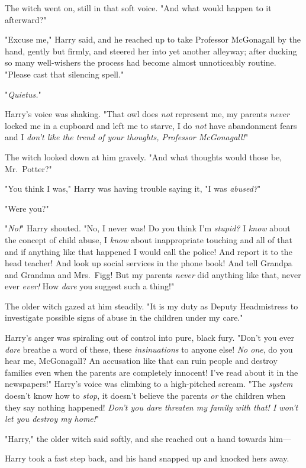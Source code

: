 The witch went on, still in that soft voice. "And what would happen to it
afterward?"

"Excuse me," Harry said, and he reached up to take Professor McGonagall by the
hand, gently but firmly, and steered her into yet another alleyway; after
ducking so many well-wishers the process had become almost unnoticeably
routine. "Please cast that silencing spell."

"\emph{Quietus.}"

Harry's voice was shaking. "That owl does \emph{not} represent me, my parents
\emph{never} locked me in a cupboard and left me to starve, I do \emph{not}
have abandonment fears and I \emph{don't like the trend of your thoughts,
Professor McGonagall!}"

The witch looked down at him gravely. "And what thoughts would those be,
Mr.~Potter?"

"You think I was," Harry was having trouble saying it, "I was \emph{abused?}"

"Were you?"

"\emph{No!}" Harry shouted. "No, I never was! Do you think I'm \emph{stupid?} I
\emph{know} about the concept of child abuse, I \emph{know} about inappropriate
touching and all of that and if anything like that happened I would call the
police! And report it to the head teacher! And look up social services in the
phone book! And tell Grandpa and Grandma and Mrs.~Figg! But my parents
\emph{never} did anything like that, never ever \emph{ever!} How \emph{dare}
you suggest such a thing!"

The older witch gazed at him steadily. "It is my duty as Deputy Headmistress to
investigate possible signs of abuse in the children under my care."

Harry's anger was spiraling out of control into pure, black fury. "Don't you
ever \emph{dare} breathe a word of these, these \emph{insinuations} to anyone
else! \emph{No one}, do you hear me, McGonagall? An accusation like that can
ruin people and destroy families even when the parents are completely innocent!
I've read about it in the newspapers!" Harry's voice was climbing to a
high-pitched scream. "The \emph{system} doesn't know how to \emph{stop}, it
doesn't believe the parents \emph{or} the children when they say nothing
happened! \emph{Don't you dare threaten my family with that! I won't let you
destroy my home!}"

"Harry," the older witch said softly, and she reached out a hand towards him—

Harry took a fast step back, and his hand snapped up and knocked hers away.

